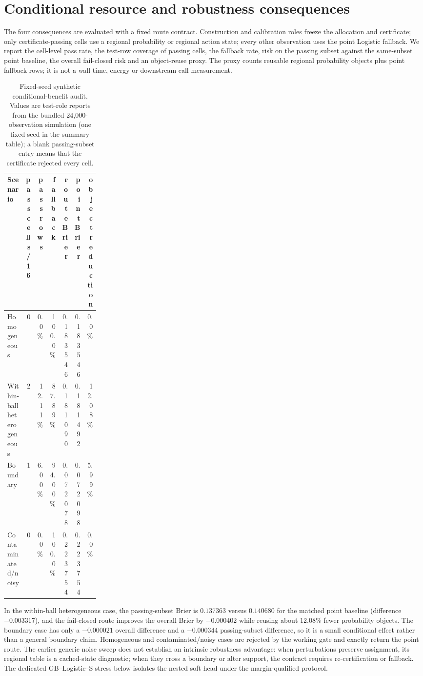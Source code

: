 \documentclass[11pt,a4paper]{article}
\numberwithin{equation}{section}
\theoremstyle{definition}\newtheorem{definition}[theorem]{Definition}
\theoremstyle{remark}\newtheorem{remark}[theorem]{Remark}
\begin{document}
\section{Conditional resource and robustness consequences}\label{sec:conditional_consequences}
The four consequences are evaluated with a fixed route contract. Construction and
calibration roles freeze the allocation and certificate; only certificate-passing
cells use a regional probability or regional action state; every other observation
uses the point Logistic fallback. We report the cell-level pass rate, the test-row
coverage of passing cells, the fallback rate, risk on the passing subset against
the same-subset point baseline, the overall fail-closed risk and an object-reuse
proxy. The proxy counts reusable regional probability objects plus point fallback
rows; it is not a wall-time, energy or downstream-call measurement.

\begin{table}[H]
\centering\small
\caption{Fixed-seed synthetic conditional-benefit audit. Values are test-role
reports from the bundled 24,000-observation simulation (one fixed seed in
the summary table); a blank passing-subset entry means that the certificate
rejected every cell.}
\begin{tabular}{L{0.22\linewidth}rrrrrr}
\toprule
Scenario & pass cells/16 & pass rows & fallback & route Brier & point Brier & object reduction\\
\midrule
Homogeneous & 0 & 0.0\% & 100.0\% & 0.183546 & 0.183546 & 0.0\%\\
Within-ball heterogeneous & 2 & 12.11\% & 87.89\% & 0.181090 & 0.181492 & 12.08\%\\
Boundary & 1 & 6.00\% & 94.00\% & 0.072078 & 0.072098 & 5.99\%\\
Contaminated/noisy & 0 & 0.0\% & 100.0\% & 0.223754 & 0.223754 & 0.0\%\\
\bottomrule
\end{tabular}
\end{table}

In the within-ball heterogeneous case, the passing-subset Brier is
$0.137363$ versus $0.140680$ for the matched point baseline (difference
$-0.003317$), and the fail-closed route improves the overall Brier by
$-0.000402$ while reusing about 12.08\% fewer probability objects. The boundary
case has only a $-0.000021$ overall difference and a $-0.000344$ passing-subset
difference, so it is a small conditional effect rather than a general boundary
claim. Homogeneous and contaminated/noisy cases are rejected by the working gate
and exactly return the point route. The earlier generic noise sweep does not establish an intrinsic robustness
advantage: when perturbations preserve assignment, its regional table is a
cached-state diagnostic; when they cross a boundary or alter support, the
contract requires re-certification or fallback. The dedicated GB--Logistic--S
stress below isolates the nested soft head under the margin-qualified protocol.
\end{document}
